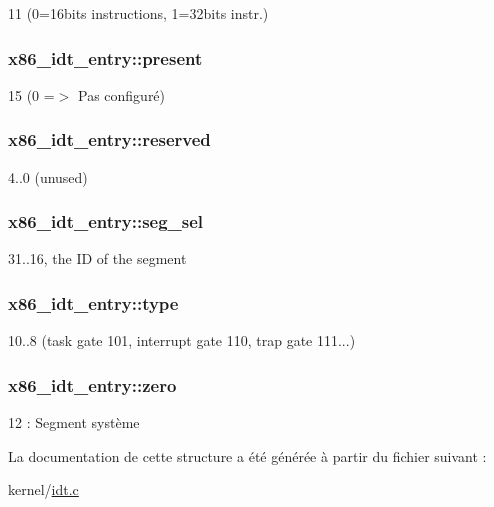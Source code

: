 11 (0=16bits instructions, 1=32bits instr.) \hypertarget{structx86__idt__entry_aad5f9c737cf3c83abf7f5561acaa0891}{
\subsubsection[{present}]{ x86\-\_\-idt\-\_\-entry\-::present}}\label{structx86__idt__entry_aad5f9c737cf3c83abf7f5561acaa0891}
15 (0 =$>$ Pas configuré) \hypertarget{structx86__idt__entry_adb99b161a27397d74e715d962b1c65fa}{
\subsubsection[{reserved}]{ x86\-\_\-idt\-\_\-entry\-::reserved}}\label{structx86__idt__entry_adb99b161a27397d74e715d962b1c65fa}
4..0 (unused) \hypertarget{structx86__idt__entry_a47f891095976b78c547b428be1b91c87}{
\subsubsection[{seg\-\_\-sel}]{ x86\-\_\-idt\-\_\-entry\-::seg\-\_\-sel}}\label{structx86__idt__entry_a47f891095976b78c547b428be1b91c87}
31..16, the I\-D of the segment \hypertarget{structx86__idt__entry_a826ef1aafc2352576ec3493747b964f5}{
\subsubsection[{type}]{ x86\-\_\-idt\-\_\-entry\-::type}}\label{structx86__idt__entry_a826ef1aafc2352576ec3493747b964f5}
10..8 (task gate 101, interrupt gate 110, trap gate 111...) \hypertarget{structx86__idt__entry_ac291c67a44d2457bda76146d1bc5e920}{
\subsubsection[{zero}]{ x86\-\_\-idt\-\_\-entry\-::zero}}\label{structx86__idt__entry_ac291c67a44d2457bda76146d1bc5e920}
12 \-: Segment système 

La documentation de cette structure a été générée à partir du fichier suivant \-:\begin{DoxyCompactItemize}
\item 
kernel/\hyperlink{idt_8c}{idt.\-c}\end{DoxyCompactItemize}

